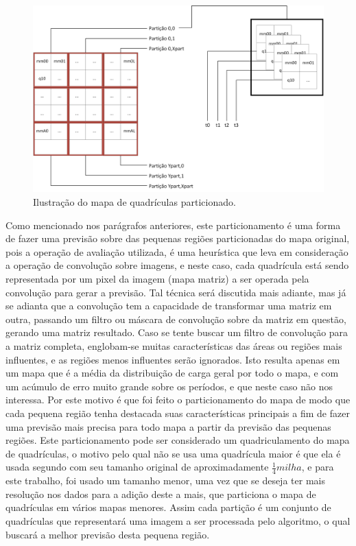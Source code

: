 \begin{figure}[h]
	\centering	\includegraphics[scale=0.6]{Figuras/Ilustrations-PartitionedQuadricMap.png}
	\caption{Ilustração do mapa de quadrículas particionado.}
	\label{fig:PartitionedQuadricMap}
\end{figure}

Como mencionado nos parágrafos anteriores, este particionamento  é uma forma de fazer uma previsão sobre das pequenas regiões particionadas do mapa original, pois a operação de avaliação utilizada, é uma heurística que leva em consideração a operação de convolução sobre imagens, e neste caso, cada quadrícula está sendo representada por um pixel da imagem (mapa matriz) a ser operada pela convolução para gerar a previsão. Tal técnica será discutida mais adiante, mas já se adianta que a convolução tem a capacidade de  transformar uma matriz em outra, passando um filtro ou máscara de convolução sobre da matriz em questão, gerando uma matriz resultado. Caso se tente buscar um filtro de convolução para a matriz completa, englobam-se muitas características das áreas ou regiões mais influentes, e as regiões menos influentes serão ignorados. Isto resulta  apenas em um mapa que é a média da distribuição de carga geral por todo o mapa, e com um acúmulo de erro muito grande sobre os períodos, e que neste caso não nos interessa. Por este motivo é que foi feito o particionamento do mapa de modo que cada pequena região tenha destacada suas características principais a fim de fazer uma previsão mais precisa para todo mapa a partir da previsão das pequenas regiões. Este particionamento pode ser considerado um quadriculamento do mapa de quadrículas, o motivo pelo qual não se usa  uma quadrícula maior é que ela é usada segundo \citeauthor{willis2002spatial} \cite{willis2002spatial} com seu tamanho original de aproximadamente \(\frac{1}{4} milha\),  e para este trabalho, foi usado um tamanho menor, uma vez que se deseja ter mais resolução nos dados para a adição deste a mais, que particiona o mapa de quadrículas em vários mapas menores. Assim cada  partição é um conjunto de quadrículas que representará uma imagem a ser processada pelo algoritmo, o qual buscará a melhor previsão desta pequena região.

